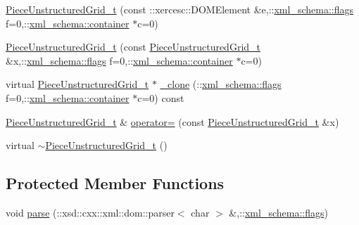\begin{DoxyCompactItemize}
\item 
\hyperlink{classPieceUnstructuredGrid__t_a56c6d065b161aa4f28789044d082c622}{Piece\+Unstructured\+Grid\+\_\+t} (const \+::xercesc\+::\+D\+O\+M\+Element \&e,\+::\hyperlink{namespacexml__schema_a0612287d030cb2732d31a45b258fdc87}{xml\+\_\+schema\+::flags} f=0,\+::\hyperlink{namespacexml__schema_ada9aa30dc722e93ee2ed7243085402a5}{xml\+\_\+schema\+::container} $\ast$c=0)
\item 
\hyperlink{classPieceUnstructuredGrid__t_a6a1c61bdda2b5458715e902eae2420f9}{Piece\+Unstructured\+Grid\+\_\+t} (const \hyperlink{classPieceUnstructuredGrid__t}{Piece\+Unstructured\+Grid\+\_\+t} \&x,\+::\hyperlink{namespacexml__schema_a0612287d030cb2732d31a45b258fdc87}{xml\+\_\+schema\+::flags} f=0,\+::\hyperlink{namespacexml__schema_ada9aa30dc722e93ee2ed7243085402a5}{xml\+\_\+schema\+::container} $\ast$c=0)
\item 
virtual \hyperlink{classPieceUnstructuredGrid__t}{Piece\+Unstructured\+Grid\+\_\+t} $\ast$ \hyperlink{classPieceUnstructuredGrid__t_a48f6dcab2714e3f907993e1c99bcc8b2}{\+\_\+clone} (\+::\hyperlink{namespacexml__schema_a0612287d030cb2732d31a45b258fdc87}{xml\+\_\+schema\+::flags} f=0,\+::\hyperlink{namespacexml__schema_ada9aa30dc722e93ee2ed7243085402a5}{xml\+\_\+schema\+::container} $\ast$c=0) const 
\item 
\hyperlink{classPieceUnstructuredGrid__t}{Piece\+Unstructured\+Grid\+\_\+t} \& \hyperlink{classPieceUnstructuredGrid__t_ac314efbccef897349a02419c720a2d63}{operator=} (const \hyperlink{classPieceUnstructuredGrid__t}{Piece\+Unstructured\+Grid\+\_\+t} \&x)
\item 
virtual \hyperlink{classPieceUnstructuredGrid__t_a9d1eb720775ac4e3b7778f898decc264}{$\sim$\+Piece\+Unstructured\+Grid\+\_\+t} ()
\end{DoxyCompactItemize}
\subsection*{Protected Member Functions}
\begin{DoxyCompactItemize}
\item 
void \hyperlink{classPieceUnstructuredGrid__t_af30015c07de07a0ffb1f92eea8a48ebe}{parse} (\+::xsd\+::cxx\+::xml\+::dom\+::parser$<$ char $>$ \&,\+::\hyperlink{namespacexml__schema_a0612287d030cb2732d31a45b258fdc87}{xml\+\_\+schema\+::flags})
\end{DoxyCompactItemize}
